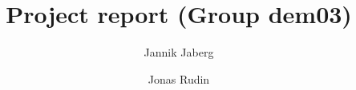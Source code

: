 \title{Project report (Group dem03)} %
\author{Jannik Jaberg \and Jonas Rudin} %

\institute{\lectureInstitute} %
\begin{report}











\end{report}

